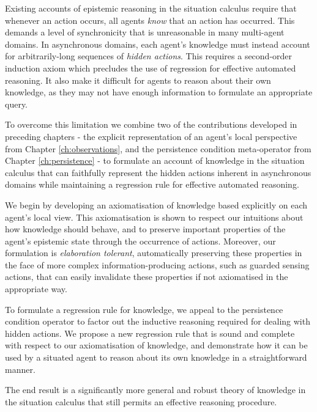 Existing accounts of epistemic reasoning in the situation calculus
require that whenever an action occurs, all agents \emph{know} that
an action has occurred. This demands a level of synchronicity that
is unreasonable in many multi-agent domains. In asynchronous domains,
each agent's knowledge must instead account for arbitrarily-long sequences
of \emph{hidden actions}. This requires a second-order induction axiom
which precludes the use of regression for effective automated reasoning.
It also make it difficult for agents to reason about their own knowledge,
as they may not have enough information to formulate an appropriate
query.

To overcome this limitation we combine two of the contributions developed
in preceding chapters - the explicit representation of an agent's
local perspective from Chapter \ref{ch:observations}, and the persistence
condition meta-operator from Chapter \ref{ch:persistence} - to formulate
an account of knowledge in the situation calculus that can faithfully
represent the hidden actions inherent in asynchronous domains while
maintaining a regression rule for effective automated reasoning.

We begin by developing an axiomatisation of knowledge based explicitly
on each agent's local view. This axiomatisation is shown to respect
our intuitions about how knowledge should behave, and to preserve
important properties of the agent's epistemic state through the occurrence
of actions. Moreover, our formulation is \emph{elaboration tolerant},
automatically preserving these properties in the face of more complex
information-producing actions, such as guarded sensing actions, that
can easily invalidate these properties if not axiomatised in the appropriate
way.

To formulate a regression rule for knowledge, we appeal to the persistence
condition operator to factor out the inductive reasoning required
for dealing with hidden actions. We propose a new regression rule
that is sound and complete with respect to our axiomatisation of knowledge,
and demonstrate how it can be used by a situated agent to reason about
its own knowledge in a straightforward manner.

The end result is a significantly more general and robust theory of
knowledge in the situation calculus that still permits an effective
reasoning procedure.

